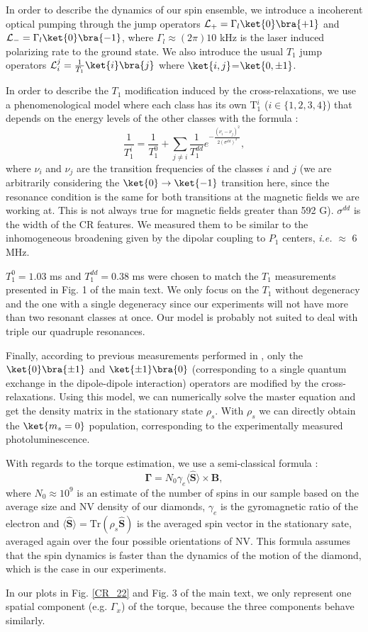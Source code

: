 \documentclass[preprintnumbers,amsmath,amssymb,onecolumn,12pt]{revtex4}
\begin{document}
In order to describe the dynamics of our spin ensemble, we introduce a incoherent optical pumping through the jump operators $\mathcal{L}_+ = \Gamma_l \ket{0}\bra{+1} $ and $\mathcal{L}_- = \Gamma_l \ket{0}\bra{-1} $, where $\Gamma_l \approx (2\pi) 10$ kHz is the laser induced polarizing rate to the ground state.
We also introduce the usual $T_1$ jump operators $\mathcal{L}_i^j= \frac{1}{T_1}\ket{i}\bra{j}$ where $\ket{i,j}$=$\ket{0, \pm 1}$.

In order to describe the $T_1$ modification induced by the cross-relaxations, we use a phenomenological model where each class has its own T$_1^i$ ($i \in \{1,2,3,4\}$) that depends on the energy levels of the other classes with the formula :
\begin{equation*}
\frac{1}{T_1^i}=\frac{1}{T_1^0}+\sum_{j \neq i} \frac{1}{T_1^{dd}}e^{-\frac{(\nu_i-\nu_j)^2}{2(\sigma^{dd})^2}},
\end{equation*}
where $\nu_i$ and $\nu_j$ are the transition frequencies of the classes $i$ and $j$ (we are arbitrarily considering the $\ket{0} \to \ket{-1}$ transition here, since the resonance condition is the same for both transitions at the magnetic fields we are working at. This is not always true for magnetic fields greater than 592 G\citep{van_oort_cross-relaxation_1989}). 
$\sigma^{dd} $ is the width of the CR features. We measured them to be similar to the inhomogeneous broadening given by the dipolar coupling to $P_1$ centers, {\it i.e.} $\approx$ 6 MHz.  

$T_1^0=1.03$ ms and $T_1^{dd}=0.38$ ms were chosen to match the $T_1$ measurements presented in Fig. 1 of the main text. We only focus on the $T_1$ without degeneracy and the one with a single degeneracy since our experiments will not have more than two resonant classes at once. Our model is probably not suited to deal with triple our quadruple resonances.

Finally, according to previous measurements performed in \citep{choi_depolarization_2017}, only the $\ket{0}\bra{\pm1}$ and $\ket{\pm1}\bra{0}$ (corresponding to a single quantum exchange in the dipole-dipole interaction) operators are modified by the cross-relaxations. Using this model, we can numerically solve the master equation and get the density matrix in the stationary state $\rho_s$. With $\rho_s$ we can directly obtain the $\ket{m_s=0}$ population, corresponding to the experimentally measured photoluminescence.

With regards to the torque estimation, we use a semi-classical formula :
\begin{equation*}
\mathbf \Gamma = N_0 \gamma_e \langle\hat{\mathbf S}\rangle \times \mathbf B,
\end{equation*}
where $N_0 \approx 10^9$ is an estimate of the number of spins in our sample based on the average size and NV density of our diamonds, $\gamma_e$ is the gyromagnetic ratio of the electron and $\langle\hat{\mathbf S}\rangle =\mathrm{Tr}(\rho_s \mathbf{\hat S})$ is the averaged spin vector in the stationary sate, averaged again over the four possible orientations of NV.
This formula assumes that the spin dynamics is faster than the dynamics of the motion of the diamond, which is the case in our experiments.

In our plots in Fig. \ref{CR_22} and Fig. 3 of the main text, we only represent one spatial component (e.g. $\Gamma_x$) of the torque, because the three components behave similarly.

\end{document}
